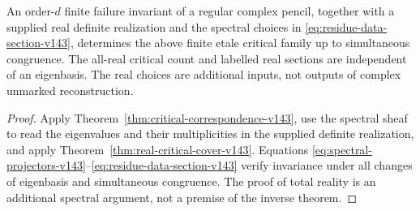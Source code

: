 \begin{corollary}
\label{cor:failure-to-critical-v143}
An order-\(d\) finite failure invariant of a regular complex pencil,
together with a supplied real definite realization and the spectral
choices in \eqref{eq:residue-data-section-v143}, determines the
above finite etale critical family up to simultaneous congruence.
The all-real critical count and labelled real sections are independent
of an eigenbasis.  The real choices are additional inputs, not
outputs of complex unmarked reconstruction.
\end{corollary}
\begin{proof}
Apply Theorem~\ref{thm:critical-correspondence-v143}, use the
spectral sheaf to read the eigenvalues and their multiplicities in
the supplied definite realization, and apply
Theorem~\ref{thm:real-critical-cover-v143}.  Equations
\eqref{eq:spectral-projectors-v143}--\eqref{eq:residue-data-section-v143}
verify invariance under all changes of eigenbasis and simultaneous
congruence.  The proof of total reality is an additional spectral
argument, not a premise of the inverse theorem.
\end{proof}
